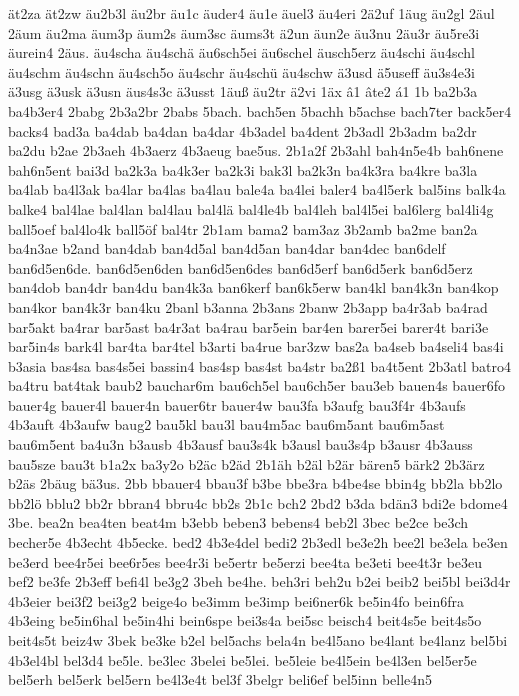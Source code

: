 {ät2za
ät2zw
äu2b3l
äu2br
äu1c
äuder4
äu1e
äuel3
äu4eri
2ä2uf
1äug
äu2gl
2äul
2äum
äu2ma
äum3p
äum2s
äum3sc
äums3t
ä2un
äun2e
äu3nu
2äu3r
äu5re3i
äurein4
2äus.
äu4scha
äu4schä
äu6sch5ei
äu6schel
äusch5erz
äu4schi
äu4schl
äu4schm
äu4schn
äu4sch5o
äu4schr
äu4schü
äu4schw
ä3usd
ä5useff
äu3s4e3i
ä3usg
ä3usk
ä3usn
äus4s3c
ä3usst
1äuß
äu2tr
ä2vi
1äx
â1
âte2
á1
1b
ba2b3a
ba4b3er4
2babg
2b3a2br
2babs
5bach.
bach5en
5bachh
b5achse
bach7ter
back5er4
backs4
bad3a
ba4dab
ba4dan
ba4dar
4b3adel
ba4dent
2b3adl
2b3adm
ba2dr
ba2du
b2ae
2b3aeh
4b3aerz
4b3aeug
bae5us.
2b1a2f
2b3ahl
bah4n5e4b
bah6nene
bah6n5ent
bai3d
ba2k3a
ba4k3er
ba2k3i
bak3l
ba2k3n
ba4k3ra
ba4kre
ba3la
ba4lab
ba4l3ak
ba4lar
ba4las
ba4lau
bale4a
ba4lei
baler4
ba4l5erk
bal5ins
balk4a
balke4
bal4lae
bal4lan
bal4lau
bal4lä
bal4le4b
bal4leh
bal4l5ei
bal6lerg
bal4li4g
ball5oef
bal4lo4k
ball5öf
bal4tr
2b1am
bama2
bam3az
3b2amb
ba2me
ban2a
ba4n3ae
b2and
ban4dab
ban4d5al
ban4d5an
ban4dar
ban4dec
ban6delf
ban6d5en6de.
ban6d5en6den
ban6d5en6des
ban6d5erf
ban6d5erk
ban6d5erz
ban4dob
ban4dr
ban4du
ban4k3a
ban6kerf
ban6k5erw
ban4kl
ban4k3n
ban4kop
ban4kor
ban4k3r
ban4ku
2banl
b3anna
2b3ans
2banw
2b3app
ba4r3ab
ba4rad
bar5akt
ba4rar
bar5ast
ba4r3at
ba4rau
bar5ein
bar4en
barer5ei
barer4t
bari3e
bar5in4s
bark4l
bar4ta
bar4tel
b3arti
ba4rue
bar3zw
bas2a
ba4seb
ba4seli4
bas4i
b3asia
bas4sa
bas4s5ei
bassin4
bas4sp
bas4st
ba4str
ba2ß1
ba4t5ent
2b3atl
batro4
ba4tru
bat4tak
baub2
bauchar6m
bau6ch5el
bau6ch5er
bau3eb
bauen4s
bauer6fo
bauer4g
bauer4l
bauer4n
bauer6tr
bauer4w
bau3fa
b3aufg
bau3f4r
4b3aufs
4b3auft
4b3aufw
baug2
bau5kl
bau3l
bau4m5ac
bau6m5ant
bau6m5ast
bau6m5ent
ba4u3n
b3ausb
4b3ausf
bau3s4k
b3ausl
bau3s4p
b3ausr
4b3auss
bau5sze
bau3t
b1a2x
ba3y2o
b2äc
b2äd
2b1äh
b2äl
b2är
bären5
bärk2
2b3ärz
b2äs
2bäug
bä3us.
2bb
bbauer4
bbau3f
b3be
bbe3ra
b4be4se
bbin4g
bb2la
bb2lo
bb2lö
bblu2
bb2r
bbran4
bbru4c
bb2s
2b1c
bch2
2bd2
b3da
bdän3
bdi2e
bdome4
3be.
bea2n
bea4ten
beat4m
b3ebb
beben3
bebens4
beb2l
3bec
be2ce
be3ch
becher5e
4b3echt
4b5ecke.
bed2
4b3e4del
bedi2
2b3edl
be3e2h
bee2l
be3ela
be3en
be3erd
bee4r5ei
bee6r5es
bee4r3i
be5ertr
be5erzi
bee4ta
be3eti
bee4t3r
be3eu
bef2
be3fe
2b3eff
befi4l
be3g2
3beh
be4he.
beh3ri
beh2u
b2ei
beib2
bei5bl
bei3d4r
4b3eier
bei3f2
bei3g2
beige4o
be3imm
be3imp
bei6ner6k
be5in4fo
bein6fra
4b3eing
be5in6hal
be5in4hi
bein6spe
bei3s4a
bei5sc
beisch4
beit4s5e
beit4s5o
beit4s5t
beiz4w
3bek
be3ke
b2el
bel5achs
bela4n
be4l5ano
be4lant
be4lanz
bel5bi
4b3el4bl
bel3d4
be5le.
be3lec
3belei
be5lei.
be5leie
be4l5ein
be4l3en
bel5er5e
bel5erh
bel5erk
bel5ern
be4l3e4t
bel3f
3belgr
beli6ef
bel5inn
belle4n5
}
